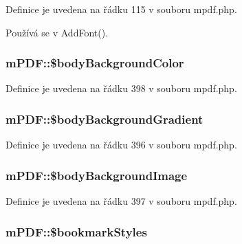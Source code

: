 Definice je uvedena na řádku 115 v souboru mpdf.\-php.



Používá se v Add\-Font().

\hypertarget{classm_p_d_f_a701ef2b6bb3e1eda60126f0e9bbd1d37}{
\subsubsection[{\$body\-Background\-Color}]{\setlength{\rightskip}{0pt plus 5cm}m\-P\-D\-F\-::\$body\-Background\-Color}}\label{classm_p_d_f_a701ef2b6bb3e1eda60126f0e9bbd1d37}


Definice je uvedena na řádku 398 v souboru mpdf.\-php.

\hypertarget{classm_p_d_f_a257ca4fd010273e07b1d10eb3b662bdd}{
\subsubsection[{\$body\-Background\-Gradient}]{\setlength{\rightskip}{0pt plus 5cm}m\-P\-D\-F\-::\$body\-Background\-Gradient}}\label{classm_p_d_f_a257ca4fd010273e07b1d10eb3b662bdd}


Definice je uvedena na řádku 396 v souboru mpdf.\-php.

\hypertarget{classm_p_d_f_ad9a0ac06604e4bbc503074a38dbb642c}{
\subsubsection[{\$body\-Background\-Image}]{\setlength{\rightskip}{0pt plus 5cm}m\-P\-D\-F\-::\$body\-Background\-Image}}\label{classm_p_d_f_ad9a0ac06604e4bbc503074a38dbb642c}


Definice je uvedena na řádku 397 v souboru mpdf.\-php.

\hypertarget{classm_p_d_f_a6d5a12f0aeb149a1b66efda90279a81f}{
\subsubsection[{\$bookmark\-Styles}]{\setlength{\rightskip}{0pt plus 5cm}m\-P\-D\-F\-::\$bookmark\-Styles}}\label{classm_p_d_f_a6d5a12f0aeb149a1b66efda90279a81f}


